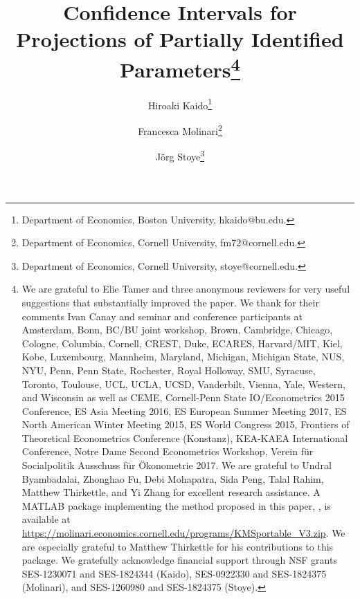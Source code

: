 \documentclass[letterpaper,11pt]{article}
\theoremstyle{myplain}
\theoremstyle{mydefinition}
\theoremstyle{myremark}
\renewcommand{\cite}{\citet}
\numberwithin{equation}{section}
\numberwithin{figure}{section}
\begin{document}
\title{Confidence Intervals for\linebreak
Projections of Partially Identified Parameters\thanks{We are grateful to Elie Tamer and three anonymous reviewers for very useful suggestions
that substantially improved the paper. We thank for their comments Ivan Canay and seminar and conference participants at Amsterdam, Bonn, BC/BU joint workshop, Brown, Cambridge, Chicago, Cologne, Columbia, Cornell, CREST, Duke, ECARES, Harvard/MIT, Kiel, Kobe, Luxembourg, Mannheim, Maryland, Michigan, Michigan State, NUS, NYU, Penn, Penn State, Rochester, Royal Holloway, SMU, Syracuse, Toronto, Toulouse, UCL, UCLA, UCSD, Vanderbilt, Vienna, Yale, Western, and Wisconsin as well as CEME, Cornell-Penn State IO/Econometrics 2015 Conference, ES Asia Meeting 2016, ES European Summer Meeting 2017, ES North American Winter Meeting 2015, ES World Congress 2015, Frontiers of Theoretical Econometrics Conference (Konstanz), KEA-KAEA International Conference, Notre Dame Second Econometrics Workshop, Verein f\"{u}r Socialpolitik Ausschuss f\"{u}r \"{O}konometrie 2017. We are grateful to Undral Byambadalai, Zhonghao Fu, Debi Mohapatra, Sida Peng, Talal Rahim, Matthew Thirkettle, and Yi Zhang for excellent research assistance. A MATLAB package implementing the method proposed in this paper, \cite{KMST_code}, is available at \url{https://molinari.economics.cornell.edu/programs/KMSportable_V3.zip}.  We are especially grateful to Matthew Thirkettle for his contributions to this package. We gratefully acknowledge financial support through NSF grants SES-1230071 and SES-1824344 (Kaido), SES-0922330 and SES-1824375 (Molinari), and SES-1260980 and SES-1824375 (Stoye).}}

\author{Hiroaki Kaido\thanks{Department of Economics, Boston University, hkaido@bu.edu.}
\and Francesca Molinari\thanks{Department of Economics,
Cornell University, fm72@cornell.edu.}
\and J\"{o}rg Stoye\thanks{Department of Economics, Cornell University, stoye@cornell.edu.}}

\maketitle
\end{document}
